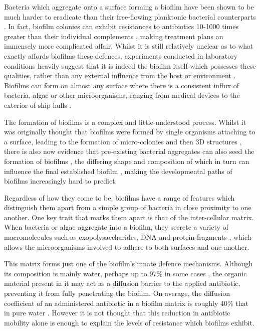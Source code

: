 \documentclass[a4paper,12pt]{article}
\begin{document}
Bacteria which aggregate onto a surface forming a biofilm have been shown to be much harder to eradicate than their free-flowing planktonic bacterial 
counterparts \cite{bioref:Lewis-biofilm-riddle-2001}.  In fact, biofilm colonies can exhibit resistances to antibiotics 10-1000 times greater than their individual complements 
\cite{bioref:Anderson-innate-biofilm-resistances-2008}, making treatment plans an immensely more complicated affair.  Whilst it is still relatively unclear as to what exactly affords 
biofilms these defences, experiments conducted in laboratory conditions heavily suggest that it is indeed the biofilm itself which possesses these qualities, rather than any external 
influence from the host or environment \cite{bioref:Stewart-biofilm-resis-mechanisms-2002}.  Biofilms can form on almost any surface where there is a consistent influx of bacteria, algae  
or other microorganisms, ranging from medical devices \cite{bioref:Donlan-biofilms-medical-devices-2002} to the exterior of ship hulls \cite{bioref:Chambers-modern-antifoul-coatings-2006}.  

The formation of biofilms is a complex and little-understood process.  Whilst it was originally thought that biofilms were formed by single organisms attaching to a surface, leading to 
the formation of micro-colonies and then 3D structures \cite{bioref:Monds-biofilm-formation-2009}, there is also now evidence that pre-existing bacterial aggregates can also 
seed the formation of biofilms \cite{bioref:hall-stooley-biofilm-clumps-2005}, the differing shape and composition of which in turn can influence the final established biofilm 
\cite{bioref:Xavier-biofilm-framework-multiD-modelling-2005}, making the developmental paths of biofilms increasingly hard to predict.

Regardless of how they come to be, biofilms have a range of features which distinguish them apart from a simple group of bacteria in close proximity to one another. One key trait 
that marks them apart is that of the inter-cellular matrix.  When bacteria or algae aggregate into a biofilm, they secrete a variety of macromolecules such as exopolysaccharides, DNA and 
protein fragments \cite{bioref:Whitechurch-biomatrix-components-2002}, which allows the microorganisms involved to adhere to both surfaces and one another.

This matrix forms just one of the biofilm's innate defence mechanisms.  Although its composition is mainly water, perhaps up to 97\% in some cases 
\cite{bioref:Zhang-biofilm-water97pc-1998}, the organic material present in it may act as a diffusion barrier to the applied antibiotic, preventing it from fully penetrating 
the biofilm.  On average, the diffusion coefficient of an administered antibiotic in a biofilm matrix is roughly 40\% that in pure water 
\cite{bioref:Stewart-biofilm-diffusion-coeff-1998}.  However it is not thought that this reduction in antibiotic mobility alone is enough to explain the levels of resistance which 
biofilms exhibit.  
\end{document}
